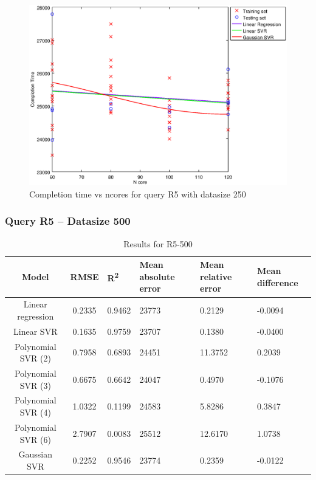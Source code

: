 \documentclass[a4paper,11pt]{article}
\begin{document}
\begin {figure}[hbtp]
\centering
\includegraphics[width=\textwidth]{output/R5_250_LINEAR_NCORE/plot_R5_250_bestmodels.eps}
\caption{Completion time vs ncores for query R5 with datasize 250}
\label{fig:all_linear_R5_250}
\end {figure}

\newpage
\subsubsection{Query R5 -- Datasize 500}
\begin{table}[H]
	\centering
	\begin{adjustbox}{center}
		\begin{tabular}{c | c M{1.2cm} M{2.5cm} M{2.5cm} M{1.8cm}}
			Model & RMSE & R\textsuperscript{2} & Mean absolute error & Mean relative error & Mean difference \tabularnewline
			\hline
			Linear regression & 0.2335 & 0.9462 &  23773 & 0.2129 & -0.0094 \\
			Linear SVR & 0.1635 & 0.9759 &  23707 & 0.1380 & -0.0400 \\
			Polynomial SVR (2) & 0.7958 & 0.6893 &  24451 & 11.3752 & 0.2039 \\
			Polynomial SVR (3) & 0.6675 & 0.6642 &  24047 & 0.4970 & -0.1076 \\
			Polynomial SVR (4) & 1.0322 & 0.1199 &  24583 & 5.8286 & 0.3847 \\
			Polynomial SVR (6) & 2.7907 & 0.0083 &  25512 & 12.6170 & 1.0738 \\
			Gaussian SVR & 0.2252 & 0.9546 &  23774 & 0.2359 & -0.0122 \\
		\end{tabular}
	\end{adjustbox}
	\\
	\caption{Results for R5-500}
	\label{fig:all_linear_R5_500}
\end{table}
\end{document}
